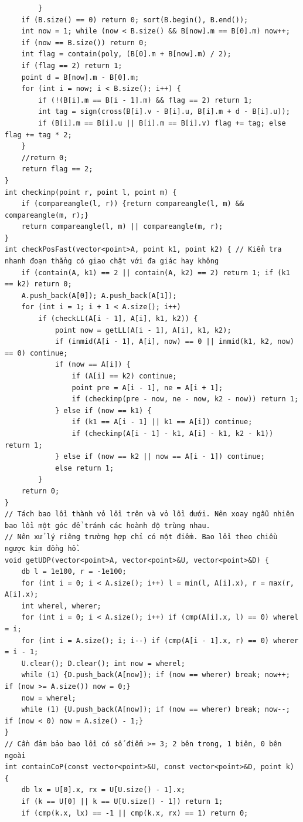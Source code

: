 \documentclass[11pt]{article}
\begin{document}
\begin{verbatim}
		}
	if (B.size() == 0) return 0; sort(B.begin(), B.end());
	int now = 1; while (now < B.size() && B[now].m == B[0].m) now++;
	if (now == B.size()) return 0;
	int flag = contain(poly, (B[0].m + B[now].m) / 2);
	if (flag == 2) return 1;
	point d = B[now].m - B[0].m;
	for (int i = now; i < B.size(); i++) {
		if (!(B[i].m == B[i - 1].m) && flag == 2) return 1;
		int tag = sign(cross(B[i].v - B[i].u, B[i].m + d - B[i].u));
		if (B[i].m == B[i].u || B[i].m == B[i].v) flag += tag; else flag += tag * 2;
	}
	//return 0;
	return flag == 2;
}
int checkinp(point r, point l, point m) {
	if (compareangle(l, r)) {return compareangle(l, m) && compareangle(m, r);}
	return compareangle(l, m) || compareangle(m, r);
}
int checkPosFast(vector<point>A, point k1, point k2) { // Kiểm tra nhanh đoạn thẳng có giao chặt với đa giác hay không
	if (contain(A, k1) == 2 || contain(A, k2) == 2) return 1; if (k1 == k2) return 0;
	A.push_back(A[0]); A.push_back(A[1]);
	for (int i = 1; i + 1 < A.size(); i++)
		if (checkLL(A[i - 1], A[i], k1, k2)) {
			point now = getLL(A[i - 1], A[i], k1, k2);
			if (inmid(A[i - 1], A[i], now) == 0 || inmid(k1, k2, now) == 0) continue;
			if (now == A[i]) {
				if (A[i] == k2) continue;
				point pre = A[i - 1], ne = A[i + 1];
				if (checkinp(pre - now, ne - now, k2 - now)) return 1;
			} else if (now == k1) {
				if (k1 == A[i - 1] || k1 == A[i]) continue;
				if (checkinp(A[i - 1] - k1, A[i] - k1, k2 - k1)) return 1;
			} else if (now == k2 || now == A[i - 1]) continue;
			else return 1;
		}
	return 0;
}
// Tách bao lồi thành vỏ lồi trên và vỏ lồi dưới. Nên xoay ngẫu nhiên bao lồi một góc để tránh các hoành độ trùng nhau.
// Nên xử lý riêng trường hợp chỉ có một điểm. Bao lồi theo chiều ngược kim đồng hồ.
void getUDP(vector<point>A, vector<point>&U, vector<point>&D) {
	db l = 1e100, r = -1e100;
	for (int i = 0; i < A.size(); i++) l = min(l, A[i].x), r = max(r, A[i].x);
	int wherel, wherer;
	for (int i = 0; i < A.size(); i++) if (cmp(A[i].x, l) == 0) wherel = i;
	for (int i = A.size(); i; i--) if (cmp(A[i - 1].x, r) == 0) wherer = i - 1;
	U.clear(); D.clear(); int now = wherel;
	while (1) {D.push_back(A[now]); if (now == wherer) break; now++; if (now >= A.size()) now = 0;}
	now = wherel;
	while (1) {U.push_back(A[now]); if (now == wherer) break; now--; if (now < 0) now = A.size() - 1;}
}
// Cần đảm bảo bao lồi có số điểm >= 3; 2 bên trong, 1 biên, 0 bên ngoài
int containCoP(const vector<point>&U, const vector<point>&D, point k) {
	db lx = U[0].x, rx = U[U.size() - 1].x;
	if (k == U[0] || k == U[U.size() - 1]) return 1;
	if (cmp(k.x, lx) == -1 || cmp(k.x, rx) == 1) return 0;

\end{verbatim}
\end{document}
